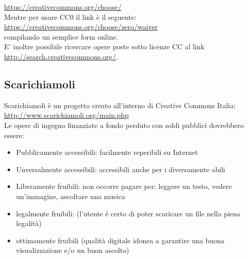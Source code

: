 \url{https://creativecommons.org/choose/}\\

Mentre per usare CC0 il link è il seguente: \\

\url{https://creativecommons.org/choose/zero/waiver}\\

compilando un semplice form online.\\

E' inoltre possibile ricercare opere poste sotto licenze CC al link \\

\url{http://search.creativecommons.org/}.\\

\subsection{Scarichiamoli}

Scarichiamoli è un progetto creato all'interno di Creative Commons
Italia: \\

\url{http://www.scarichiamoli.org/main.php} \\

Le opere di ingegno finanziate a fondo perduto con soldi pubblici dovrebbero essere:

\begin{itemize}
\item Pubblicamente accessibili: facilmente reperibili su Internet
\item Unversalmente accessibili: accessibili anche per i diversamente abili
\item Liberamente fruibili: non occorre pagare per: leggere un testo, vedere un'immagine, ascoltare una musica
\item legalmente fruibili: (l'utente è certo di poter scaricare un file nella piena legalità)
\item ottimamente fruibili (qualità digitale idonea a garantire una buona visualizzazione e/o un buon ascolto)
\end{itemize}